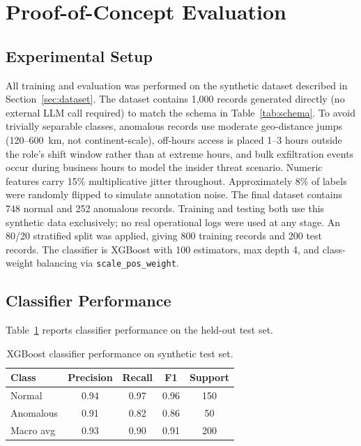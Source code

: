 \documentclass[conference]{IEEEtran}
\begin{document}
\section{Proof-of-Concept Evaluation}

\subsection{Experimental Setup}

All training and evaluation was performed on the synthetic dataset described in Section~\ref{sec:dataset}. The dataset contains 1,000 records generated directly (no external LLM call required) to match the schema in Table~\ref{tab:schema}. To avoid trivially separable classes, anomalous records use moderate geo-distance jumps (120--600~km, not continent-scale), off-hours access is placed 1--3 hours outside the role's shift window rather than at extreme hours, and bulk exfiltration events occur during business hours to model the insider threat scenario. Numeric features carry 15\% multiplicative jitter throughout. Approximately 8\% of labels were randomly flipped to simulate annotation noise. The final dataset contains 748 normal and 252 anomalous records. Training and testing both use this synthetic data exclusively; no real operational logs were used at any stage. An 80/20 stratified split was applied, giving 800 training records and 200 test records. The classifier is XGBoost with 100 estimators, max depth 4, and class-weight balancing via \texttt{scale\_pos\_weight}.

\subsection{Classifier Performance}

Table~\ref{tab:results} reports classifier performance on the held-out test set.

\begin{table}[t]
\centering
\caption{XGBoost classifier performance on synthetic test set.}
\label{tab:results}
\begin{tabular}{lcccc}
\toprule
\textbf{Class} & \textbf{Precision} & \textbf{Recall} & \textbf{F1} & \textbf{Support} \\
\midrule
Normal    & 0.94 & 0.97 & 0.96 & 150 \\
Anomalous & 0.91 & 0.82 & 0.86 &  50 \\
\midrule
Macro avg & 0.93 & 0.90 & 0.91 & 200 \\
\bottomrule
\end{tabular}
\end{table}
\end{document}
